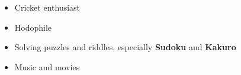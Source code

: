 \documentclass[10pt,a4paper,ragged2e,withhyper]{altacv}
\begin{document}
\begin{paracol}{2}
\begin{itemize}
    \item Cricket enthusiast
    \item Hodophile
    \item Solving puzzles and riddles, especially \textbf{Sudoku} and \textbf{Kakuro}
    \item Music and movies
\end{itemize}


\newpage





\end{paracol}
\end{document}

